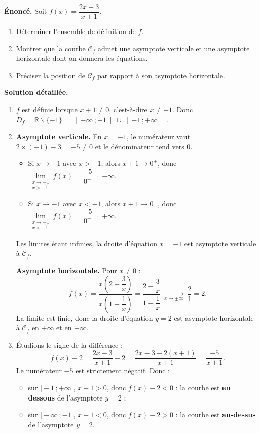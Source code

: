 \documentclass[11pt]{article}
\def\setminus{\mathbin{\backslash}}\let\smallsetminus\setminus
\begin{document}
\begin{exoresolu}[Étude complète des asymptotes de $f(x) = \dfrac{2x-3}{x+1}$]
\textbf{Énoncé.} Soit $f(x) = \dfrac{2x-3}{x+1}$.
\begin{enumerate}
\item Déterminer l'ensemble de définition de $f$.
\item Montrer que la courbe $\mathcal{C}_f$ admet une asymptote verticale et une asymptote horizontale dont on donnera les équations.
\item Préciser la position de $\mathcal{C}_f$ par rapport à son asymptote horizontale.
\end{enumerate}
\tcblower
\textbf{Solution détaillée.}
\begin{enumerate}
\item $f$ est définie lorsque $x + 1 \neq 0$, c'est-à-dire $x \neq -1$. Donc $D_f = \mathbb{R}\setminus\{-1\} = \left]-\infty\,;-1\right[ \cup \left]-1\,;+\infty\right[$.
\item \textbf{Asymptote verticale.} En $x = -1$, le numérateur vaut $2\times(-1) - 3 = -5 \neq 0$ et le dénominateur tend vers $0$.
\begin{itemize}
\item Si $x \to -1$ avec $x > -1$, alors $x + 1 \to 0^{+}$, donc $\lim\limits_{\substack{x \to -1 \\ x > -1}} f(x) = \dfrac{-5}{0^{+}} = -\infty$.
\item Si $x \to -1$ avec $x < -1$, alors $x + 1 \to 0^{-}$, donc $\lim\limits_{\substack{x \to -1 \\ x < -1}} f(x) = \dfrac{-5}{0^{-}} = +\infty$.
\end{itemize}
Les limites étant infinies, la droite d'équation $\boxed{x = -1}$ est asymptote verticale à $\mathcal{C}_f$.

\textbf{Asymptote horizontale.} Pour $x \neq 0$ :
\[
f(x) = \frac{x\left(2 - \dfrac{3}{x}\right)}{x\left(1 + \dfrac{1}{x}\right)} = \frac{2 - \dfrac{3}{x}}{1 + \dfrac{1}{x}}
\ \xrightarrow[x \to \pm\infty]{}\ \frac{2}{1} = 2 .
\]
La limite est finie, donc la droite d'équation $\boxed{y = 2}$ est asymptote horizontale à $\mathcal{C}_f$ en $+\infty$ et en $-\infty$.
\item Étudions le signe de la différence :
\[
f(x) - 2 = \frac{2x - 3}{x+1} - 2 = \frac{2x - 3 - 2(x+1)}{x+1} = \frac{-5}{x+1}.
\]
Le numérateur $-5$ est strictement négatif. Donc :
\begin{itemize}
\item sur $]-1\,;+\infty[$, $x + 1 > 0$, donc $f(x) - 2 < 0$ : la courbe est \textbf{en dessous} de l'asymptote $y = 2$ ;
\item sur $]-\infty\,;-1[$, $x + 1 < 0$, donc $f(x) - 2 > 0$ : la courbe est \textbf{au-dessus} de l'asymptote $y = 2$.
\end{itemize}
\end{enumerate}
\end{exoresolu}
\end{document}
